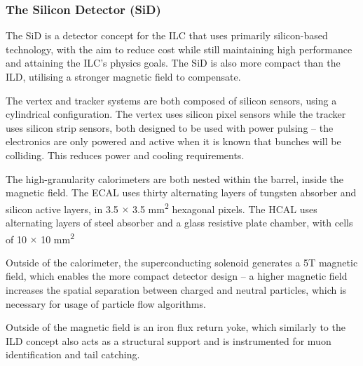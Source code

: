\subsubsection{The Silicon Detector (SiD)}
The \acrfull{SiD} is a detector concept for the \acrshort{ILC} that uses primarily silicon-based technology, with the aim to reduce cost while still maintaining high performance and attaining the \acrshort{ILC}'s physics goals. The \acrshort{SiD} is also more compact than the \acrshort{ILD}, utilising a stronger magnetic field to compensate.

The vertex and tracker systems are both composed of silicon sensors, using a cylindrical configuration. The vertex uses silicon pixel sensors while the tracker uses silicon strip sensors, both designed to be used with power pulsing -- the electronics are only powered and active when it is known that bunches will be colliding. This reduces power and cooling requirements. 

The high-granularity calorimeters are both nested within the barrel, inside the magnetic field. The \acrshort{ECAL} uses thirty alternating layers of tungsten absorber and silicon active layers, in 3.5 $\times$ 3.5 mm\textsuperscript{2} hexagonal pixels. The \acrshort{HCAL} uses alternating layers of steel absorber and a glass resistive plate chamber, with cells of 10 $\times$ 10 mm\textsuperscript{2}

Outside of the calorimeter, the superconducting solenoid generates a 5T magnetic field, which enables the more compact detector design -- a higher magnetic field increases the spatial separation between charged and neutral particles, which is necessary for usage of particle flow algorithms.

Outside of the magnetic field is an iron flux return yoke, which similarly to the \acrshort{ILD} concept also acts as a structural support and is instrumented for muon identification and tail catching. 

